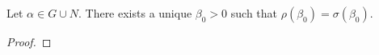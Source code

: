 \begin{lemma}Let $\alpha\in G\cup N$. There exists a unique $\beta_0>0$ such that $\rho(\beta_0)=\sigma(\beta_0)$.
\begin{proof} \end{proof}
\end{lemma}